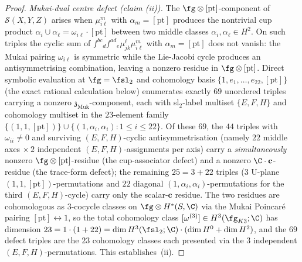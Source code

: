 \begin{proof}
\emph{Mukai-dual centre defect (claim (ii)).} The $\fg \otimes
[\mathrm{pt}]$-component of $\mathcal S(X, Y, Z)$ arises when
$\mu^m_{i\ell}$ with $\alpha_m = [\mathrm{pt}]$ produces the
nontrivial cup product $\alpha_i \cup \alpha_\ell = \omega_{i\ell}
\cdot [\mathrm{pt}]$ between two middle classes $\alpha_i, \alpha_\ell
\in H^2$. On such triples the cyclic sum of
$f^{bc}{}_d f^{ad}{}_e \mu^\ell_{jk} \mu^m_{i\ell}$ with
$\alpha_m = [\mathrm{pt}]$ does not vanish: the Mukai pairing
$\omega_{i\ell}$ is symmetric while the Lie-Jacobi cycle produces
an antisymmetrising combination, leaving a nonzero residue in
$\fg \otimes [\mathrm{pt}]$. Direct symbolic evaluation at $\fg =
\fsl_2$ and cohomology basis $\{1, e_1, \ldots, e_{22},
[\mathrm{pt}]\}$ (the exact rational calculation below) enumerates exactly $69$ unordered
triples carrying a nonzero $\mathfrak z_{\mathrm{Muk}}$-component,
each with sl$_2$-label multiset $\{E, F, H\}$ and cohomology
multiset in the $23$-element family
$\{(1, 1, [\mathrm{pt}])\} \cup \{(1, \alpha_i, \alpha_i) : 1 \leq i \leq 22\}$.
Of these $69$, the $44$ triples with $\omega_{ii} \ne 0$ and surviving
$(E, F, H)$-cyclic antisymmetrisation (namely $22$ middle axes $\times\,2$
independent $(E, F, H)$-assignments per axis) carry a \emph{simultaneously}
nonzero $\fg \otimes [\mathrm{pt}]$-residue (the cup-associator
defect) and a nonzero $\C \cdot \mathbf c$-residue (the trace-form
defect); the remaining $25 = 3 + 22$ triples ($3$ U-plane
$(1, 1, [\mathrm{pt}])$-permutations and $22$ diagonal
$(1, \alpha_i, \alpha_i)$-permutations for the third $(E, F, H)$-cycle)
carry only the scalar-$\mathbf c$ residue. The two residues are
cohomologous as $3$-cocycle classes on $\fg \otimes H^*(S, \C)$
via the Mukai Poincar\'e pairing $[\mathrm{pt}] \leftrightarrow 1$,
so the total cohomology class $[\omega^{(3)}] \in H^3(\fg_{K3}; \C)$ has
dimension $23 = 1 \cdot (1 + 22) = \dim H^3(\fsl_2; \C) \cdot (\dim H^0 + \dim H^2)$,
and the $69$ defect triples are the $23$ cohomology classes each
presented via the $3$ independent $(E, F, H)$-permutations.
This establishes~(ii).


\end{proof}
